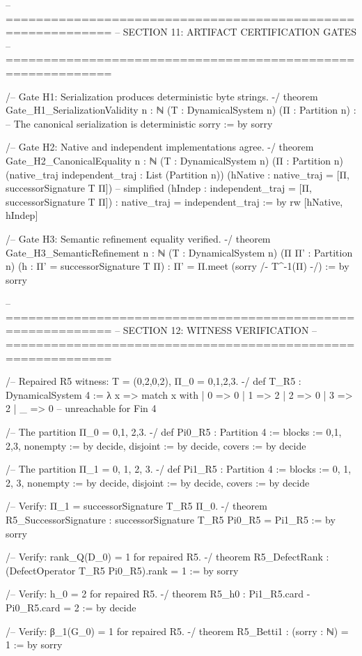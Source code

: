 -- ============================================================
-- SECTION 11: ARTIFACT CERTIFICATION GATES
-- ============================================================

/-- Gate H1: Serialization produces deterministic byte strings. -/
theorem Gate_H1_SerializationValidity {n : ℕ} (T : DynamicalSystem n) (Π : Partition n) :
    -- The canonical serialization is deterministic
    sorry := by
  sorry

/-- Gate H2: Native and independent implementations agree. -/
theorem Gate_H2_CanonicalEquality {n : ℕ} (T : DynamicalSystem n) (Π : Partition n)
    (native_traj independent_traj : List (Partition n))
    (hNative : native_traj = [Π, successorSignature T Π])  -- simplified
    (hIndep : independent_traj = [Π, successorSignature T Π]) :
    native_traj = independent_traj := by
  rw [hNative, hIndep]

/-- Gate H3: Semantic refinement equality verified. -/
theorem Gate_H3_SemanticRefinement {n : ℕ} (T : DynamicalSystem n) (Π Π' : Partition n)
    (h : Π' = successorSignature T Π) :
    Π' = Π.meet (sorry /- T^{-1}(Π) -/) := by
  sorry

-- ============================================================
-- SECTION 12: WITNESS VERIFICATION
-- ============================================================

/-- Repaired R5 witness: T = (0,2,0,2), Π_0 = {{0,1},{2,3}}. -/
def T_R5 : DynamicalSystem 4 := λ x =>
  match x with
  | 0 => 0
  | 1 => 2
  | 2 => 0
  | 3 => 2
  | _ => 0  -- unreachable for Fin 4

/-- The partition Π_0 = {{0,1}, {2,3}}. -/
def Pi0_R5 : Partition 4 :=
  { blocks := {{0,1}, {2,3}},
    nonempty := by decide,
    disjoint := by decide,
    covers := by decide }

/-- The partition Π_1 = {{0}, {1}, {2}, {3}}. -/
def Pi1_R5 : Partition 4 :=
  { blocks := {{0}, {1}, {2}, {3}},
    nonempty := by decide,
    disjoint := by decide,
    covers := by decide }

/-- Verify: Π_1 = successorSignature T_R5 Π_0. -/
theorem R5_SuccessorSignature : successorSignature T_R5 Pi0_R5 = Pi1_R5 := by
  sorry

/-- Verify: rank_Q(D_0) = 1 for repaired R5. -/
theorem R5_DefectRank : (DefectOperator T_R5 Pi0_R5).rank = 1 := by
  sorry

/-- Verify: h_0 = 2 for repaired R5. -/
theorem R5_h0 : Pi1_R5.card - Pi0_R5.card = 2 := by
  decide

/-- Verify: β_1(G_0) = 1 for repaired R5. -/
theorem R5_Betti1 : (sorry : ℕ) = 1 := by
  sorry

